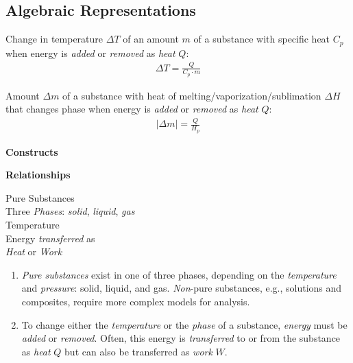 \subsection*{Algebraic Representations}

\noindent Change in temperature $\Delta T$ of an amount $m$ of a substance with specific heat $C_p$ when energy is \emph{added} or \emph{removed} as \emph{heat} $Q$:
\begin{align*}
	\Delta T = \frac{Q}{C_p \cdot m}
\end{align*}

\noindent Amount $\Delta m$ of a substance with heat of melting/vaporization/sublimation $\Delta H$ that changes phase when energy is \emph{added} or \emph{removed} as \emph{heat} $Q$:
\begin{align*}
	\left|\Delta m\right| = \frac{Q}{H_p}
\end{align*}


\pagebreak


\newcommand{\leftcolumn}{0.35\linewidth}
\newcommand{\rightcolumn}{0.65\linewidth}

\noindent
\parbox[b]{\leftcolumn}{
	\textbf{Constructs}}
\parbox[b]{\rightcolumn}{
	\textbf{Relationships}}

\noindent
\hrulefill

\noindent
\begin{minipage}[c]{\leftcolumn}
	\baselineskip
	Pure Substances\\
	Three \emph{Phases}: \emph{solid}, \emph{liquid}, \emph{gas}\\
	Temperature\\
	Energy \emph{transferred} as\\
	\hspace*{5mm}\emph{Heat} or \emph{Work}
\end{minipage}
\begin{minipage}[c]{\rightcolumn}
	\begin{enumerate}
		\item {\em Pure substances} exist in one of three phases, depending on the \emph{temperature} and \emph{pressure}: solid, liquid, and gas. {\em Non}-pure substances, e.g., solutions and composites, require more complex models for analysis.
		\item To change either the \emph{temperature} or the \emph{phase} of a substance, \emph{energy} must be \emph{added} or \emph{removed}. Often, this energy is \emph{transferred} to or from the substance as \emph{heat} $Q$ but can also be transferred as \emph{work} $W$.\\[0.2mm]
	\end{enumerate}
\end{minipage}

